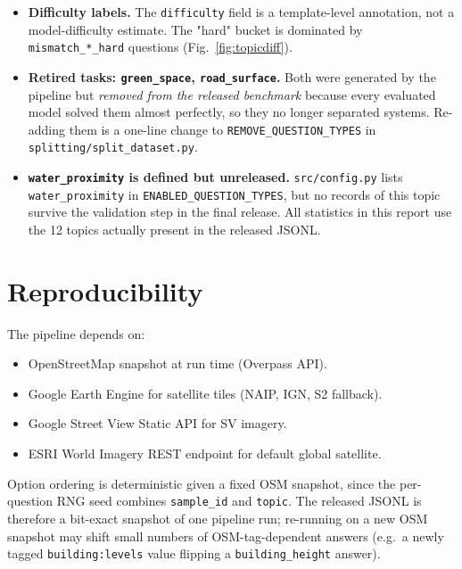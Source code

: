 \documentclass[11pt,a4paper]{article}
\begin{document}
\begin{itemize}[itemsep=3pt]
        in the final release this fallback was not triggered.
  \item \textbf{Difficulty labels.} The \texttt{difficulty} field
        is a template-level annotation, not a model-difficulty
        estimate. The "hard" bucket is dominated by
        \texttt{mismatch\_*\_hard} questions (Fig.~\ref{fig:topicdiff}).
  \item \textbf{Retired tasks: \texttt{green\_space},
        \texttt{road\_surface}.} Both were generated by the pipeline
        but \emph{removed from the released benchmark} because every
        evaluated model solved them almost perfectly, so they no longer
        separated systems. Re-adding them is a one-line change to
        \texttt{REMOVE\_QUESTION\_TYPES} in
        \texttt{splitting/split\_dataset.py}.
  \item \textbf{\texttt{water\_proximity} is defined but unreleased.}
        \texttt{src/config.py} lists \texttt{water\_proximity} in
        \texttt{ENABLED\_QUESTION\_TYPES}, but no records of this
        topic survive the validation step in the final release. All
        statistics in this report use the 12 topics actually present
        in the released JSONL.
\end{itemize}

\section{Reproducibility}

The pipeline depends on:
\begin{itemize}[itemsep=0pt]
  \item OpenStreetMap snapshot at run time (Overpass API).
  \item Google Earth Engine for satellite tiles (NAIP, IGN, S2 fallback).
  \item Google Street View Static API for SV imagery.
  \item ESRI World Imagery REST endpoint for default global satellite.
\end{itemize}

\noindent Option ordering is deterministic given a fixed OSM snapshot,
since the per-question RNG seed combines \texttt{sample\_id} and
\texttt{topic}. The released JSONL is therefore a bit-exact snapshot
of one pipeline run; re-running on a new OSM snapshot may shift
small numbers of OSM-tag-dependent answers (e.g.\ a newly tagged
\texttt{building:levels} value flipping a \texttt{building\_height}
answer).
\end{document}
